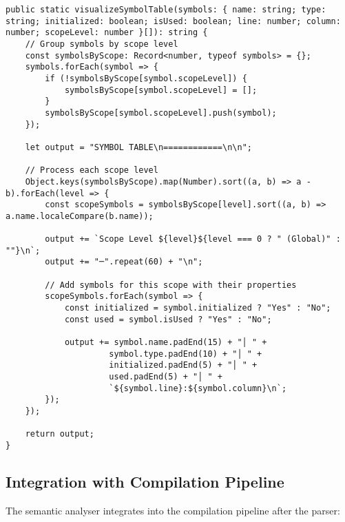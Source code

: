 \documentclass[12pt]{article}
\begin{document}
\begin{lstlisting}
public static visualizeSymbolTable(symbols: { name: string; type: string; initialized: boolean; isUsed: boolean; line: number; column: number; scopeLevel: number }[]): string {
    // Group symbols by scope level
    const symbolsByScope: Record<number, typeof symbols> = {};
    symbols.forEach(symbol => {
        if (!symbolsByScope[symbol.scopeLevel]) {
            symbolsByScope[symbol.scopeLevel] = [];
        }
        symbolsByScope[symbol.scopeLevel].push(symbol);
    });
    
    let output = "SYMBOL TABLE\n============\n\n";
    
    // Process each scope level
    Object.keys(symbolsByScope).map(Number).sort((a, b) => a - b).forEach(level => {
        const scopeSymbols = symbolsByScope[level].sort((a, b) => a.name.localeCompare(b.name));
        
        output += `Scope Level ${level}${level === 0 ? " (Global)" : ""}\n`;
        output += "─".repeat(60) + "\n";
        
        // Add symbols for this scope with their properties
        scopeSymbols.forEach(symbol => {
            const initialized = symbol.initialized ? "Yes" : "No";
            const used = symbol.isUsed ? "Yes" : "No";
            
            output += symbol.name.padEnd(15) + "│ " + 
                     symbol.type.padEnd(10) + "│ " + 
                     initialized.padEnd(5) + "│ " + 
                     used.padEnd(5) + "│ " + 
                     `${symbol.line}:${symbol.column}\n`;
        });
    });
    
    return output;
}
\end{lstlisting}

\subsection{Integration with Compilation Pipeline}
The semantic analyser integrates into the compilation pipeline after the parser:
\end{document}
